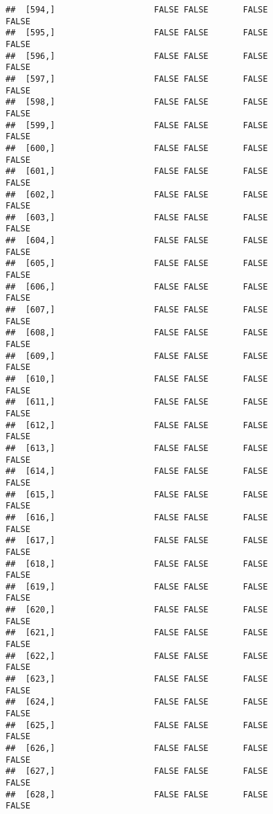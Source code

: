\documentclass[
]{article}
\begin{document}
\begin{verbatim}
##  [594,]                    FALSE FALSE       FALSE                FALSE
##  [595,]                    FALSE FALSE       FALSE                FALSE
##  [596,]                    FALSE FALSE       FALSE                FALSE
##  [597,]                    FALSE FALSE       FALSE                FALSE
##  [598,]                    FALSE FALSE       FALSE                FALSE
##  [599,]                    FALSE FALSE       FALSE                FALSE
##  [600,]                    FALSE FALSE       FALSE                FALSE
##  [601,]                    FALSE FALSE       FALSE                FALSE
##  [602,]                    FALSE FALSE       FALSE                FALSE
##  [603,]                    FALSE FALSE       FALSE                FALSE
##  [604,]                    FALSE FALSE       FALSE                FALSE
##  [605,]                    FALSE FALSE       FALSE                FALSE
##  [606,]                    FALSE FALSE       FALSE                FALSE
##  [607,]                    FALSE FALSE       FALSE                FALSE
##  [608,]                    FALSE FALSE       FALSE                FALSE
##  [609,]                    FALSE FALSE       FALSE                FALSE
##  [610,]                    FALSE FALSE       FALSE                FALSE
##  [611,]                    FALSE FALSE       FALSE                FALSE
##  [612,]                    FALSE FALSE       FALSE                FALSE
##  [613,]                    FALSE FALSE       FALSE                FALSE
##  [614,]                    FALSE FALSE       FALSE                FALSE
##  [615,]                    FALSE FALSE       FALSE                FALSE
##  [616,]                    FALSE FALSE       FALSE                FALSE
##  [617,]                    FALSE FALSE       FALSE                FALSE
##  [618,]                    FALSE FALSE       FALSE                FALSE
##  [619,]                    FALSE FALSE       FALSE                FALSE
##  [620,]                    FALSE FALSE       FALSE                FALSE
##  [621,]                    FALSE FALSE       FALSE                FALSE
##  [622,]                    FALSE FALSE       FALSE                FALSE
##  [623,]                    FALSE FALSE       FALSE                FALSE
##  [624,]                    FALSE FALSE       FALSE                FALSE
##  [625,]                    FALSE FALSE       FALSE                FALSE
##  [626,]                    FALSE FALSE       FALSE                FALSE
##  [627,]                    FALSE FALSE       FALSE                FALSE
##  [628,]                    FALSE FALSE       FALSE                FALSE

\end{verbatim}
\end{document}
